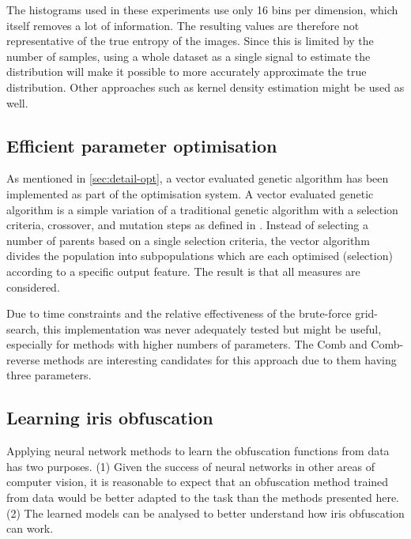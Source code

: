 The histograms used in these experiments use only 16 bins per dimension, which itself removes a lot of information. The resulting values are therefore not representative of the true entropy of the images. Since this is limited by the number of samples, using a whole dataset as a single signal to estimate the distribution will make it possible to more accurately approximate the true distribution. Other approaches such as kernel density estimation might be used as well.

\subsection{Efficient parameter optimisation}\label{sec:future-optim}
As mentioned in \cref{sec:detail-opt}, a vector evaluated genetic algorithm has been implemented as part of the optimisation system. A vector evaluated genetic algorithm is a simple variation of a traditional genetic algorithm with a selection criteria, crossover, and mutation steps as defined in \parencite[148, 222]{kochenderfer2019algorithms}. Instead of selecting a number of parents based on a single selection criteria, the vector algorithm divides the population into subpopulations which are each optimised (selection) according to a specific output feature. The result is that all measures are considered. 

Due to time constraints and the relative effectiveness of the brute-force grid-search, this implementation was never adequately tested but might be useful, especially for methods with higher numbers of parameters. The Comb and Comb-reverse methods are interesting candidates for this approach due to them having three parameters.

\subsection{Learning iris obfuscation}
Applying neural network methods to learn the obfuscation functions from data has two purposes. (1) Given the success of neural networks in other areas of computer vision, it is reasonable to expect that an obfuscation method trained from data would be better adapted to the task than the methods presented here. (2) The learned models can be analysed to better understand how iris obfuscation can work.

